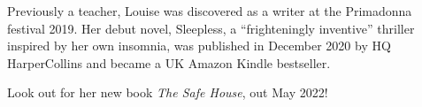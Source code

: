 Previously a teacher, Louise was discovered as a writer at the Primadonna festival 2019. Her debut novel, Sleepless, a “frighteningly inventive” thriller inspired by her own insomnia, was published in December 2020 by HQ HarperCollins and became a UK Amazon Kindle bestseller. 

Look out for her new book \emph{The Safe House}, out May 2022!